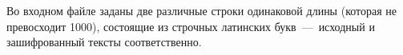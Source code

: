 Во входном файле заданы две различные строки одинаковой длины (которая не превосходит 1000), состоящие из строчных латинских букв~---~исходный и зашифрованный тексты соответственно.